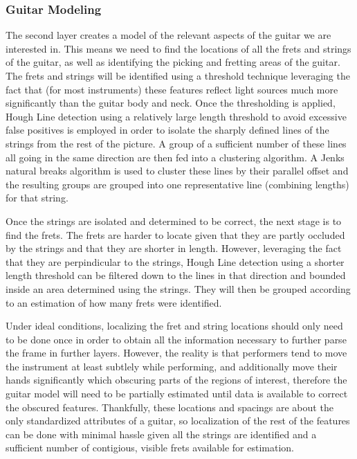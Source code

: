 \subsubsection{Guitar Modeling}
The second layer creates a model of the relevant aspects of the guitar we are interested in.
This means we need to find the locations of all the frets and strings of the guitar,
as well as identifying the picking and fretting areas of the guitar.
The frets and strings will be identified using a threshold technique leveraging the fact that (for most instruments)
these features reflect light sources much more significantly than the guitar body and neck.
Once the thresholding is applied, Hough Line detection using a relatively large length threshold to avoid excessive
false positives is employed in order to isolate the sharply defined lines of the strings from the rest of the picture.
A group of a sufficient number of these lines all going in the same direction are then fed into a clustering algorithm.
A Jenks natural breaks algorithm is used to cluster these lines by their parallel offset and the resulting groups are
grouped into one representative line (combining lengths) for that string.
\par
Once the strings are isolated and determined to be correct, the next stage is to find the frets.
The frets are harder to locate given that they are partly occluded by the strings and that they are shorter in length.
However, leveraging the fact that they are perpindicular to the strings, Hough Line detection using a shorter length
threshold can be filtered down to the lines in that direction and bounded inside an area determined using the strings.
They will then be grouped according to an estimation of how many frets were identified.
\par
Under ideal conditions, localizing the fret and string locations should only need to be done once in order to obtain
all the information necessary to further parse the frame in further layers. 
However, the reality is that performers tend to move the instrument at least subtlely while performing, and additionally
move their hands significantly which obscuring parts of the regions of interest, therefore the guitar model will need to
be partially estimated until data is available to correct the obscured features.
Thankfully, these locations and spacings are about the only standardized attributes of a guitar, so localization of the rest
of the features can be done with minimal hassle given all the strings are identified and a sufficient number of contigious,
visible frets available for estimation.
